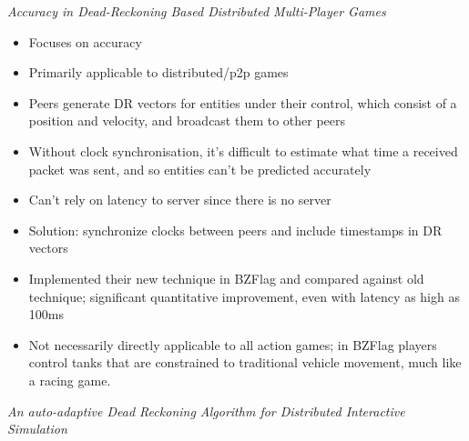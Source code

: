 \documentclass[conference]{IEEEtran}
\begin{document}
	\emph{Accuracy in Dead-Reckoning Based Distributed Multi-Player Games}

	\begin{itemize}
		\item Focuses on accuracy
		\item Primarily applicable to distributed/p2p games
		\item Peers generate DR vectors for entities under their control, which consist of a position and velocity, and broadcast them to other peers
		\item Without clock synchronisation, it's difficult to estimate what time a received packet was sent, and so entities can't be predicted accurately
		\item Can't rely on latency to server since there is no server
		\item Solution: synchronize clocks between peers and include timestamps in DR vectors
		\item Implemented their new technique in BZFlag and compared against old technique; significant quantitative improvement, even with latency as high as 100ms
		\item Not necessarily directly applicable to all action games; in BZFlag players control tanks that are constrained to traditional vehicle movement, much like a racing game.
	\end{itemize}

	\emph{An auto-adaptive Dead Reckoning Algorithm for Distributed Interactive Simulation}
\end{document}
